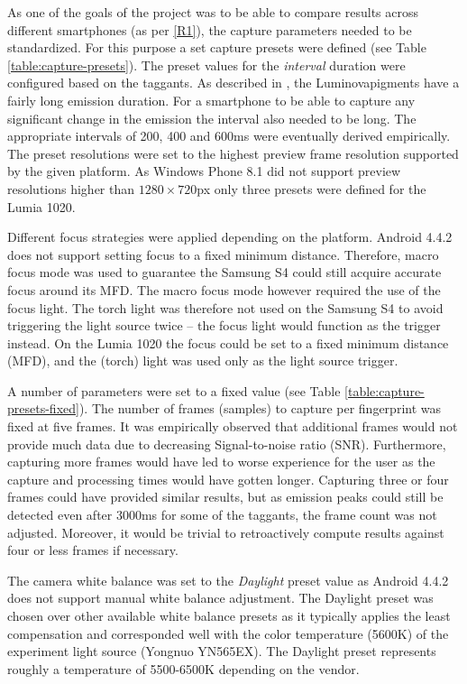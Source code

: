 \documentclass[thesis.tex]{subfiles}
\begin{document}
As one of the goals of the project was to be able to compare results across different smartphones (as per \ref{R1}), the capture parameters needed to be standardized. For this purpose a set capture presets were defined (see Table \ref{table:capture-presets}). The preset values for the \emph{interval} duration were configured based on the taggants. As described in \cite{luminova}, the Luminova\textregistered pigments have a fairly long emission duration. For a smartphone to be able to capture any significant change in the emission the interval also needed to be long. The appropriate intervals of 200, 400 and 600ms were eventually derived empirically. The preset resolutions were set to the highest preview frame resolution supported by the given platform. As Windows Phone 8.1 did not support preview resolutions higher than $1280\times720$px only three presets were defined for the Lumia 1020.

Different focus strategies were applied depending on the platform. Android 4.4.2 does not support setting focus to a fixed minimum distance. Therefore, macro focus mode was used to guarantee the Samsung S4 could still acquire accurate focus around its MFD. The macro focus mode however required the use of the focus light. The torch light was therefore not used on the Samsung S4 to avoid triggering the light source twice -- the focus light would function as the trigger instead. On the Lumia 1020 the focus could be set to a fixed minimum distance (MFD), and the (torch) light was used only as the light source trigger.

A number of parameters were set to a fixed value (see Table \ref{table:capture-presets-fixed}). The number of frames (samples) to capture per fingerprint was fixed at five frames. It was empirically observed that additional frames would not provide much data due to decreasing Signal-to-noise ratio (SNR). Furthermore, capturing more frames would have led to worse experience for the user as the capture and processing times would have gotten longer. Capturing three or four frames could have provided similar results, but as emission peaks could still be detected even after 3000ms for some of the taggants, the frame count was not adjusted. Moreover, it would be trivial to retroactively compute results against four or less frames if necessary.

The camera white balance was set to the \emph{Daylight} preset value as Android 4.4.2 does not support manual white balance adjustment. The Daylight preset was chosen over other available white balance presets as it typically applies the least compensation and corresponded well with the color temperature (5600K) of the experiment light source (Yongnuo YN565EX). The Daylight preset represents roughly a temperature of 5500-6500K depending on the vendor.
\end{document}
